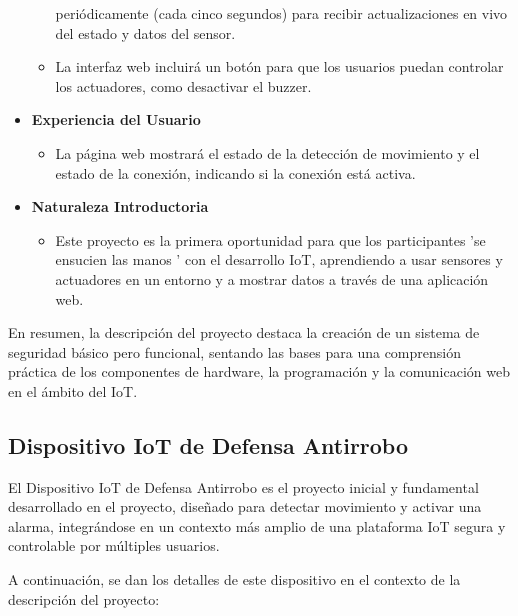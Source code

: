 \documentclass{report}
\begin{document}
\begin{itemize}
\begin{itemize}
        periódicamente (cada cinco segundos) para recibir actualizaciones en vivo del estado y datos del sensor.
        \item La interfaz web incluirá un botón para que los usuarios puedan controlar los actuadores, como desactivar el buzzer.
    \end{itemize}
    \item \textbf{Experiencia del Usuario}
    \begin{itemize}
        \item La página web mostrará el estado de la detección de movimiento y el estado de la conexión, indicando si la conexión está activa.
    \end{itemize}
        \item \textbf{Naturaleza Introductoria}
    \begin{itemize}
        \item Este proyecto es la primera oportunidad para que los participantes  'se ensucien las manos ' con el desarrollo IoT, aprendiendo a usar sensores y 
        actuadores en un entorno y a mostrar datos a través de una aplicación web.
    \end{itemize}
\end{itemize}
En resumen, la descripción del proyecto destaca la creación de un sistema de seguridad básico pero funcional, sentando las bases para una comprensión práctica 
de los componentes de hardware, la programación y la comunicación web en el ámbito del IoT.

\subsection{Dispositivo IoT de Defensa Antirrobo}
El Dispositivo IoT de Defensa Antirrobo es el proyecto inicial y fundamental desarrollado en el proyecto, diseñado para detectar movimiento y activar una 
alarma, integrándose en un contexto más amplio de una plataforma IoT segura y controlable por múltiples usuarios.

A continuación, se dan los detalles de este dispositivo en el contexto de la descripción del proyecto:
\end{document}
